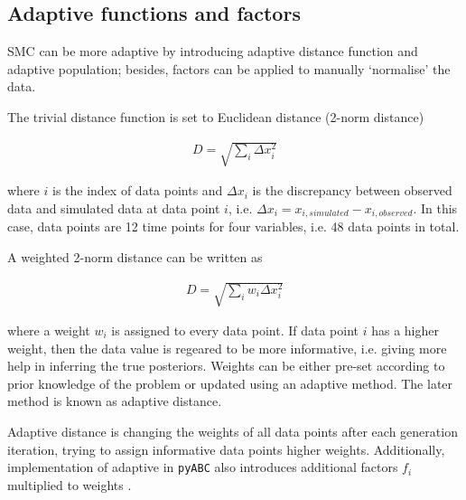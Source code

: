 





\subsection{Adaptive functions and factors}


SMC can be more adaptive by introducing adaptive distance function and adaptive population; besides, factors can be applied to manually `normalise' the data.

The trivial distance function is set to Euclidean distance (2-norm distance)

\begin{align}
    \label{eq:dis}
    D=\sqrt{\sum_i \Delta x_i^2}
\end{align}

where $i$ is the index of data points and $\Delta x_i$ is the discrepancy between  observed data and simulated data at data point $i$, i.e. $\Delta x_i = x_{i, simulated}-x_{i, observed}$. In this case, data points are 12 time points for four variables, i.e. 48 data points in total.

A weighted 2-norm distance can be written as

\begin{align}
    \label{dis_w}
    D=\sqrt{\sum_i w_i \Delta x_i^2}
\end{align}

where a weight $w_i$ is assigned to every data point. If data point $i$ has a higher weight, then the data value is regeared to be more informative, i.e. giving more help in inferring the true posteriors. Weights can be either pre-set according to prior knowledge of the problem or updated using an adaptive method. The later method is known as adaptive distance.

Adaptive distance is changing the weights of all data points after each generation iteration, trying to assign informative data points higher weights. Additionally, implementation of adaptive in \verb|pyABC| also introduces additional factors $f_i$ multiplied to weights \cite{ref:adpt_dis}.

